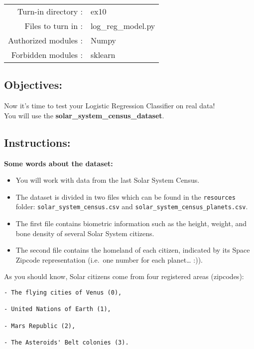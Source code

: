 \documentclass[]{article}
\begin{document}
\begin{longtable}[]{@{}rl@{}}
\toprule
\endhead
Turn-in directory : & ex10\tabularnewline
Files to turn in : & log\_reg\_model.py\tabularnewline
Authorized modules : & Numpy\tabularnewline
Forbidden modules : & sklearn\tabularnewline
\bottomrule
\end{longtable}

\hypertarget{objectives-9}{%
\subsection{Objectives:}\label{objectives-9}}

Now it's time to test your Logistic Regression Classifier on real
data!\\
You will use the \textbf{solar\_system\_census\_dataset}.

\hypertarget{instructions-9}{%
\subsection{Instructions:}\label{instructions-9}}

\textbf{Some words about the dataset:}

\begin{itemize}
\item
  You will work with data from the last Solar System Census.
\item
  The dataset is divided in two files which can be found in the
  \texttt{resources} folder: \texttt{solar\_system\_census.csv} and
  \texttt{solar\_system\_census\_planets.csv}.
\item
  The first file contains biometric information such as the height,
  weight, and bone density of several Solar System citizens.
\item
  The second file contains the homeland of each citizen, indicated by
  its Space Zipcode representation (i.e.~one number for each
  planet\ldots{} :)).
\end{itemize}

As you should know, Solar citizens come from four registered areas
(zipcodes):

\begin{verbatim}
- The flying cities of Venus (0), 

- United Nations of Earth (1), 

- Mars Republic (2), 

- The Asteroids' Belt colonies (3).
\end{verbatim}
\end{document}
